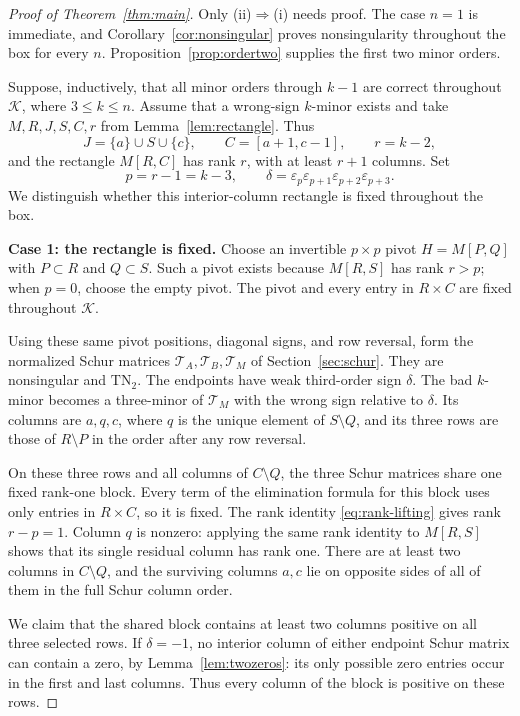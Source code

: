 \documentclass[11pt]{article}
\theoremstyle{definition}
\theoremstyle{remark}
\numberwithin{equation}{section}
\newcommand{\eps}{\varepsilon}
\newcommand{\K}{\mathcal K}
\begin{document}
\begin{proof}[Proof of Theorem~\ref{thm:main}]
Only (ii)$\Rightarrow$(i) needs proof. The case $n=1$ is immediate,
and Corollary~\ref{cor:nonsingular} proves nonsingularity throughout
the box for every $n$. Proposition~\ref{prop:ordertwo} supplies
the first two minor orders.

Suppose, inductively, that all minor orders through $k-1$ are
correct throughout $\K$, where $3\leq k\leq n$. Assume that a
wrong-sign $k$-minor exists and take $M,R,J,S,C,r$ from
Lemma~\ref{lem:rectangle}. Thus
\[
 J=\{a\}\cup S\cup\{c\},\qquad
 C=[a+1,c-1],\qquad r=k-2,
\]
and the rectangle $M[R,C]$ has rank $r$, with at least $r+1$
columns. Set
\[
 p=r-1=k-3,\qquad
 \delta=\eps_p\eps_{p+1}\eps_{p+2}\eps_{p+3}.
\]
We distinguish whether this interior-column rectangle is fixed
throughout the box.

\medskip\noindent
\textbf{Case 1: the rectangle is fixed.}
Choose an invertible $p\times p$ pivot $H=M[P,Q]$ with
$P\subset R$ and $Q\subset S$. Such a pivot exists because
$M[R,S]$ has rank $r>p$; when $p=0$, choose the empty pivot.
The pivot and every entry in $R\times C$ are fixed throughout
$\K$.

Using these same pivot positions, diagonal signs, and row reversal,
form the normalized Schur matrices
$\mathcal T_A,\mathcal T_B,\mathcal T_M$ of
Section~\ref{sec:schur}. They are nonsingular and
$\mathrm{TN}_2$. The endpoints have weak third-order sign
$\delta$. The bad $k$-minor becomes a three-minor of
$\mathcal T_M$ with the wrong sign relative to $\delta$.
Its columns are $a,q,c$, where $q$ is the unique element of
$S\setminus Q$, and its three rows are those of $R\setminus P$
in the order after any row reversal.

On these three rows and all columns of $C\setminus Q$, the
three Schur matrices share one fixed rank-one block. Every term
of the elimination formula for this block uses only entries in
$R\times C$, so it is fixed. The rank identity
\eqref{eq:rank-lifting} gives rank $r-p=1$.
Column $q$ is nonzero: applying the same rank identity to
$M[R,S]$ shows that its single residual column has rank one.
There are at least two columns in $C\setminus Q$, and the
surviving columns $a,c$ lie on opposite sides of all of them in
the full Schur column order.

We claim that the shared block contains at least two columns
positive on all three selected rows. If $\delta=-1$, no interior
column of either endpoint Schur matrix can contain a zero, by
Lemma~\ref{lem:twozeros}: its only possible zero entries occur
in the first and last columns. Thus every column of the block
is positive on these rows.


\end{proof}
\end{document}
